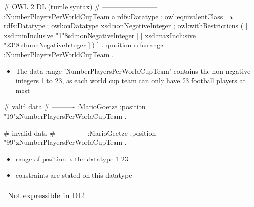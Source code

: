 \documentclass{llncs}
\newenvironment{gcotable}{
  \scriptsize
  \sffamily
  \vspace{0cm}
	\begin{center}
	\textbf{\vspace{0.4cm}Mapping to RDF-CO:} \\
  \begin{tabular}{l|l|l|l|l|l|l}
	\hline
  \textbf{c. type} & \textbf{context class} & \textbf{left p. list} & \textbf{right p. list} & \textbf{classes} & \textbf{c. element} & \textbf{c. value} \\
  \hline

}{
  \hline
  \end{tabular}
	\end{center}
}
\newenvironment{DL}{
  \vspace{0cm}
	\begin{center}
  \begin{tabular}{r l}

}{
  \end{tabular}
	\end{center}
}
\begin{document}
\begin{ex}
# OWL 2 DL (turtle syntax)
# ------------------------
:NumberPlayersPerWorldCupTeam
    a rdfs:Datatype ;
    owl:equivalentClass [
        a rdfs:Datatype ;
        owl:onDatatype xsd:nonNegativeInteger ;
        owl:withRestrictions ( 
            [ xsd:minInclusive "1"^^xsd:nonNegativeInteger ]
            [ xsd:maxInclusive "23"^^xsd:nonNegativeInteger ] ) ] .
:position rdfs:range :NumberPlayersPerWorldCupTeam .
\end{ex}

\begin{itemize}
	\item The data range 'NumberPlayersPerWorldCupTeam' contains the non negative integers 1 to 23, as each world cup team can only have 23 football players at most
\end{itemize}

\begin{ex}
# valid data
# ----------
:MarioGoetze
    :position "19"^^:NumberPlayersPerWorldCupTeam .
\end{ex}

\begin{ex}
# invalid data
# ------------
:MarioGoetze
    :position "99"^^:NumberPlayersPerWorldCupTeam .
\end{ex}

\begin{itemize}
	\item range of position is the datatype 1-23
  \item constraints are stated on this datatype
\end{itemize}


\begin{DL}
Not expressible in DL!
\end{DL}

%
\end{document}
